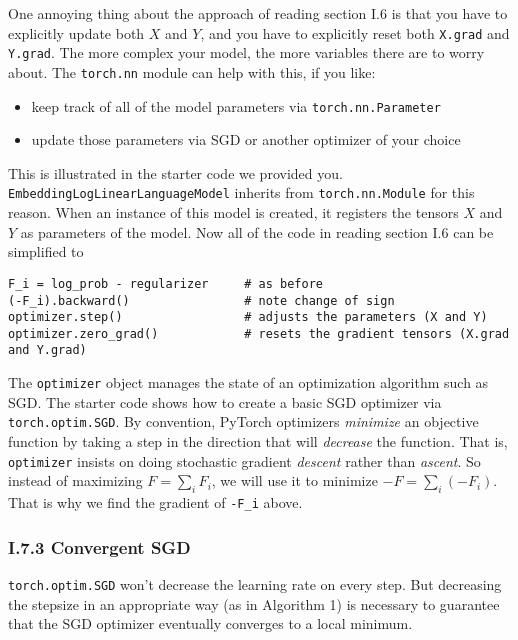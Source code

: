 One annoying thing about the approach of reading section I.6 is that you have to explicitly update both $X$ and $Y$, and you have to explicitly reset both \texttt{X.grad} and \texttt{Y.grad}. The more complex your model, the more variables there are to worry about. The \texttt{torch.nn} module can help with this, if you like:

\begin{itemize}
  \item keep track of all of the model parameters via \texttt{torch.nn.Parameter}
  \item update those parameters via SGD or another optimizer of your choice
\end{itemize}

This is illustrated in the starter code we provided you. \texttt{EmbeddingLogLinearLanguageModel} inherits from \texttt{torch.nn.Module} for this reason. When an instance of this model is created, it registers the tensors $X$ and $Y$ as parameters of the model. Now all of the code in reading section I.6 can be simplified to

\begin{verbatim}
F_i = log_prob - regularizer     # as before
(-F_i).backward()                # note change of sign
optimizer.step()                 # adjusts the parameters (X and Y)
optimizer.zero_grad()            # resets the gradient tensors (X.grad and Y.grad)
\end{verbatim}

The \texttt{optimizer} object manages the state of an optimization algorithm such as SGD. The starter code shows how to create a basic SGD optimizer via \texttt{torch.optim.SGD}. By convention, PyTorch optimizers \emph{minimize} an objective function by taking a step in the direction that will \emph{decrease} the function. That is, \texttt{optimizer} insists on doing stochastic gradient \emph{descent} rather than \emph{ascent}. So instead of maximizing $F = \sum_i F_i$, we will use it to minimize $-F = \sum_i (-F_i)$. That is why we find the gradient of \texttt{-F\_i} above.

\subsubsection*{I.7.3 Convergent SGD}

\texttt{torch.optim.SGD} won’t decrease the learning rate on every step. But decreasing the stepsize in an appropriate way (as in Algorithm 1) is necessary to guarantee that the SGD optimizer eventually converges to a local minimum.

